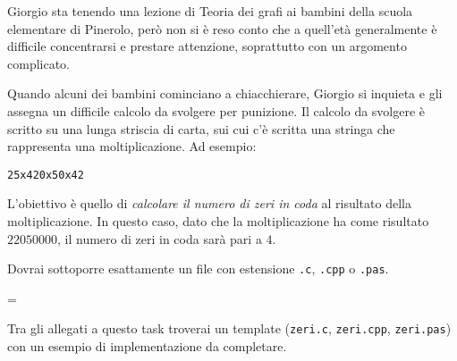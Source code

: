 \usepackage{xcolor}
\usepackage{afterpage}
\usepackage{pifont,mdframed}
\usepackage[bottom]{footmisc}

\makeatletter
\gdef\this@inputfilename{input.txt}
\gdef\this@outputfilename{output.txt}
\makeatother

\newcommand{\inputfile}{\texttt{input.txt}}
\newcommand{\outputfile}{\texttt{output.txt}}

\newenvironment{warning}
  {\par\begin{mdframed}[linewidth=2pt,linecolor=gray]%
    \begin{list}{}{\leftmargin=1cm
                   \labelwidth=\leftmargin}\item[\Large\ding{43}]}
  {\end{list}\end{mdframed}\par}

Giorgio sta tenendo una lezione di Teoria dei grafi ai bambini della scuola elementare di Pinerolo, però non si è reso conto che a quell'età generalmente è difficile concentrarsi e prestare attenzione, soprattutto con un argomento complicato.

Quando alcuni dei bambini cominciano a chiacchierare, Giorgio si inquieta e gli assegna un difficile calcolo da svolgere per punizione. Il calcolo da svolgere è scritto su una lunga striscia di carta, sui cui c'è scritta una stringa che rappresenta una moltiplicazione. Ad esempio:

\begin{center}
    \texttt{25x420x50x42}
\end{center}

L'obiettivo è quello di \emph{calcolare il numero di zeri in coda} al risultato della moltiplicazione. In questo caso, dato che la moltiplicazione ha come risultato $22050000$, il numero di zeri in coda sarà pari a $4$.


\Implementation
Dovrai sottoporre esattamente un file con estensione \texttt{.c}, \texttt{.cpp} o \texttt{.pas}.

\begin{warning}
Tra gli allegati a questo task troverai un template (\texttt{zeri.c}, \texttt{zeri.cpp}, \texttt{zeri.pas}) con un esempio di implementazione da completare.
\end{warning}

